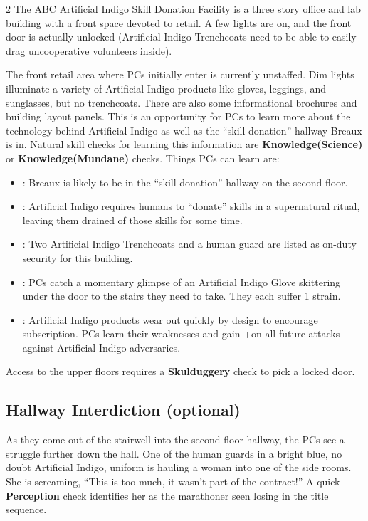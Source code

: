 \documentclass{book}
\newcommand{\df}{\DifficultyDie }
\newcommand{\stb}{\SetbackDie }
\newcommand{\bbb}{\BoostDie }
\newcommand{\ai}{{\color{cyan}Artificial Indigo}\xspace}
\begin{document}
\begin{multicols*}{2}
The ABC \ai Skill Donation Facility is a three story office and lab building with a front space devoted to retail.  A few lights are on, and the front door is actually unlocked (\ai Trenchcoats need to be able to easily drag uncooperative volunteers inside).

The front retail area where PCs initially enter is currently unstaffed.  Dim lights illuminate a variety of \ai products like gloves, leggings, and sunglasses, but no trenchcoats.  There are also some informational brochures and building layout panels.  This is an opportunity for PCs to learn more about the technology behind \ai as well as the ``skill donation'' hallway Breaux is in.  Natural skill checks for learning this information are \df\df \textbf{Knowledge(Science)} or \df\df\stb \textbf{Knowledge(Mundane)} checks.  Things PCs can learn are:

\begin{itemize}
    \setlength\itemsep{-.5em}
    \item \Success: Breaux is likely to be in the ``skill donation'' hallway on the second floor.
    \item \Success: \ai requires humans to ``donate'' skills in a supernatural ritual, leaving them drained of those skills for some time.
    \item \Advantage\Advantage: Two \ai Trenchcoats and a human guard are listed as on-duty security for this building.
    \item \Threat\Threat: PCs catch a momentary glimpse of an \ai Glove skittering under the door to the stairs they need to take.  They each suffer 1 strain.
    \item \Triumph: \ai products wear out quickly by design to encourage subscription.  PCs learn their weaknesses and gain +\bbb on all future attacks against \ai adversaries.
\end{itemize}

  Access to the upper floors requires a \df\df\stb\stb \textbf{Skulduggery} check to pick a locked door.

\subsection{Hallway Interdiction (optional)}

As they come out of the stairwell into the second floor hallway, the PCs see a struggle further down the hall.  One of the human guards in a bright blue, no doubt \ai, uniform is hauling a woman into one of the side rooms.  She is screaming, ``This is too much, it wasn't part of the contract!''  A quick \df\df \textbf{Perception} check identifies her as the marathoner seen losing in the title sequence.


\end{multicols*}
\end{document}
